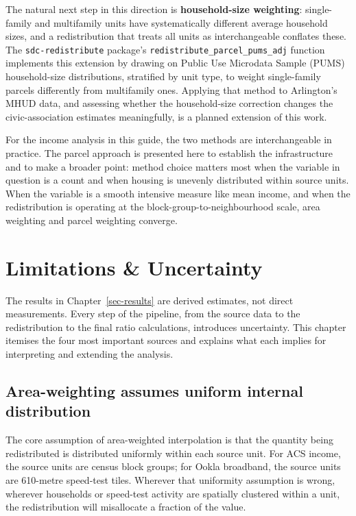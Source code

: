\documentclass[
  letterpaper,
  DIV=11,
  numbers=noendperiod]{scrreprt}
\begin{document}
The natural next step in this direction is \textbf{household-size
weighting}: single-family and multifamily units have systematically
different average household sizes, and a redistribution that treats all
units as interchangeable conflates these. The \texttt{sdc-redistribute}
package's \texttt{redistribute\_parcel\_pums\_adj} function implements
this extension by drawing on Public Use Microdata Sample (PUMS)
household-size distributions, stratified by unit type, to weight
single-family parcels differently from multifamily ones. Applying that
method to Arlington's MHUD data, and assessing whether the
household-size correction changes the civic-association estimates
meaningfully, is a planned extension of this work.

For the income analysis in this guide, the two methods are
interchangeable in practice. The parcel approach is presented here to
establish the infrastructure and to make a broader point: method choice
matters most when the variable in question is a count and when housing
is unevenly distributed within source units. When the variable is a
smooth intensive measure like mean income, and when the redistribution
is operating at the block-group-to-neighbourhood scale, area weighting
and parcel weighting converge.


\chapter{Limitations \& Uncertainty}\label{sec-limits}

The results in Chapter~\ref{sec-results} are derived estimates, not
direct measurements. Every step of the pipeline, from the source data to
the redistribution to the final ratio calculations, introduces
uncertainty. This chapter itemises the four most important sources and
explains what each implies for interpreting and extending the analysis.

\section{Area-weighting assumes uniform internal
distribution}\label{area-weighting-assumes-uniform-internal-distribution}

The core assumption of area-weighted interpolation is that the quantity
being redistributed is distributed uniformly within each source unit.
For ACS income, the source units are census block groups; for Ookla
broadband, the source units are 610-metre speed-test tiles. Wherever
that uniformity assumption is wrong, wherever households or speed-test
activity are spatially clustered within a unit, the redistribution will
misallocate a fraction of the value.
\end{document}
